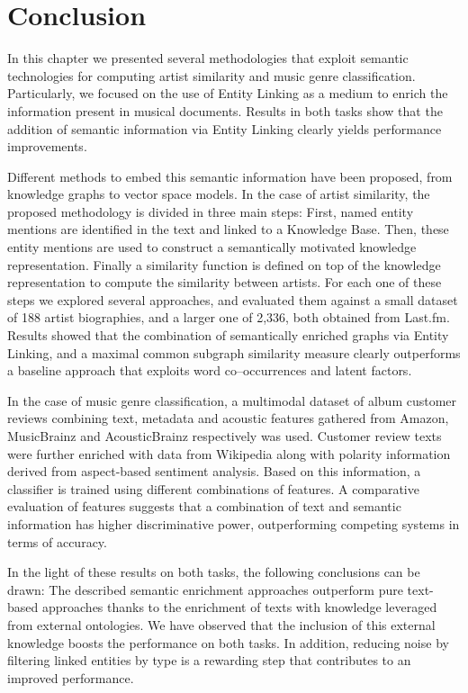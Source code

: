 \section{Conclusion}
\label{sec:similarity:conclusion}

In this chapter we presented several methodologies that exploit semantic technologies for computing artist similarity and music genre classification. Particularly, we focused on the use of Entity Linking as a medium to enrich the information present in musical documents. Results in both tasks show that the addition of semantic information via Entity Linking clearly yields performance improvements.

Different methods to embed this semantic information have been proposed, from knowledge graphs to vector space models.
In the case of artist similarity, the proposed methodology is divided in three main steps: First, named entity mentions are identified in the text and linked to a Knowledge Base. Then, these entity mentions are used to construct a semantically motivated knowledge representation. Finally a similarity function is defined on top of the knowledge representation to compute the similarity between artists.
For each one of these steps we explored several approaches, and evaluated them against a small dataset of 188 artist biographies, and a larger one of 2,336, both obtained from Last.fm.
Results showed that the combination of semantically enriched graphs via Entity Linking, and a maximal common subgraph similarity measure clearly outperforms a baseline approach that exploits word co--occurrences and latent factors.

In the case of music genre classification, a multimodal dataset of album customer reviews combining text, metadata and acoustic features gathered from Amazon, MusicBrainz and AcousticBrainz respectively was used. Customer review texts were further enriched with data from Wikipedia along with polarity information derived from aspect-based sentiment analysis. Based on this information, a classifier is trained using different combinations of features. 
A comparative evaluation of features suggests that a combination of text and semantic information has higher discriminative power, outperforming competing systems in terms of accuracy.

In the light of these results on both tasks, the following conclusions can be drawn: The described semantic enrichment approaches outperform pure text-based approaches thanks to the enrichment of texts with knowledge leveraged from external ontologies. We have observed that the inclusion of this external knowledge boosts the performance on both tasks. In addition, reducing noise by filtering linked entities by type is a rewarding step that contributes to an improved performance.
